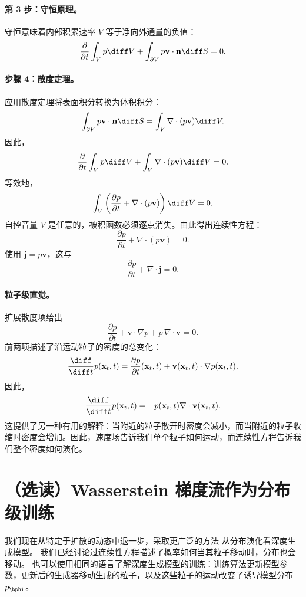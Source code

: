 \paragraph{第 3 步：守恒原理。}
守恒意味着内部积累速率 $V$ 等于净向外通量的负值：
\[
\frac{\partial}{\partial t} \int_V p \diff V + \int_{\partial V} p \mathbf{v} \cdot \mathbf{n} \diff S = 0.
\]

\paragraph{步骤 4：散度定理。}
应用散度定理将表面积分转换为体积积分：
\[
\int_{\partial V} p \mathbf{v} \cdot \mathbf{n} \diff S = \int_V \nabla \cdot (p \mathbf{v}) \diff V.
\]
因此，
\[
\frac{\partial}{\partial t} \int_V p \diff V + \int_V \nabla \cdot (p \mathbf{v}) \diff V = 0.
\]
等效地，
\[
\int_V \left(\frac{\partial p}{\partial t}+\nabla\cdot(p\mathbf{v})\right)\diff V=0.
\]
自控音量 $V$ 是任意的，被积函数必须逐点消失。由此得出连续性方程：
\[
\frac{\partial p}{\partial t}+\nabla\cdot(p\mathbf{v})=0.
\]
使用 $\mathbf{j}=p\mathbf{v}$，这与
\[
\frac{\partial p}{\partial t}+\nabla\cdot\mathbf{j}=0.
\]

\paragraph{粒子级直觉。}
扩展散度项给出
\[
\frac{\partial p}{\partial t}
+
\mathbf{v}\cdot\nabla p
+
p\,\nabla\cdot\mathbf{v}
=
0.
\]
前两项描述了沿运动粒子的密度的总变化：
\[
\frac{\diff}{\diff t}p(\mathbf{x}_t,t)
=
\frac{\partial p}{\partial t}(\mathbf{x}_t,t)
+
\mathbf{v}(\mathbf{x}_t,t)\cdot\nabla p(\mathbf{x}_t,t).
\]
因此，
\[
\frac{\diff}{\diff t}p(\mathbf{x}_t,t)
=
-
p(\mathbf{x}_t,t)\nabla\cdot\mathbf{v}(\mathbf{x}_t,t).
\]
这提供了另一种有用的解释：当附近的粒子散开时密度会减小，而当附近的粒子收缩时密度会增加。因此，速度场告诉我们单个粒子如何运动，而连续性方程告诉我们整个密度如何演化。


\section{（选读）Wasserstein 梯度流作为分布级训练}
\label{sec:wgf-distribution-level-training}我们现在从特定于扩散的动态中退一步，采取更广泛的方法
从分布演化看深度生成模型。  我们已经讨论过连续性方程描述了概率如何当其粒子移动时，分布也会移动。   也可以使用相同的语言了解深度生成模型的训练：训练算法更新模型参数，更新后的生成器移动生成的粒子，以及这些粒子的运动改变了诱导模型分布
$p_{\bphi}$。

